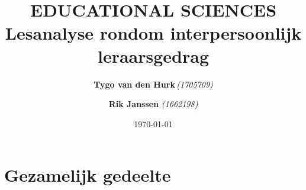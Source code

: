 \documentclass{article}
\title{ 
    \normalsize 
    \textsc{} \\
    [2.0cm]
    \HRule{1.5pt} \\
    \LARGE \textbf{
        \uppercase{
            Educational sciences}
    \HRule{2.0pt} \\ 
    [0.6cm] 
    \LARGE{
        Lesanalyse rondom interpersoonlijk leraarsgedrag} 
    \vspace*{
        10\baselineskip}}
}
\date{\today}
\author{
    \textbf{Tygo van den Hurk}\,\orcidlink{0009-0003-4182-5076}\textit{(1705709)} \and
    \textbf{Rik Janssen} \textit{(1662198)}
}
\begin{document}
    
    
    \maketitle
    \thispagestyle{empty}
    \newpage
    
    
    \renewcommand{\contentsname}{Inhoudsopgave}
    \tableofcontents
    \thispagestyle{empty}
    \newpage


    \section{Gezamelijk gedeelte}
\end{document}
